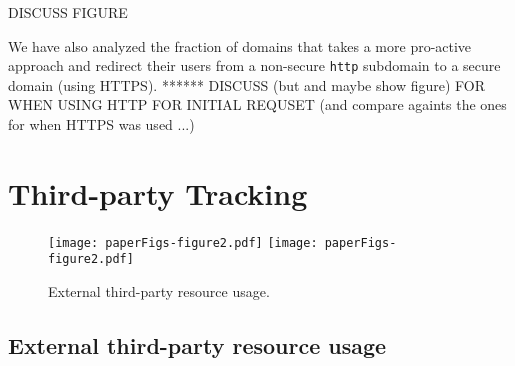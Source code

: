 \documentclass{sig-alternate-10pt}
\begin{document}
DISCUSS FIGURE

We have also analyzed the fraction of domains that takes a 
more pro-active approach and redirect their users from a non-secure \texttt{http} subdomain
to a secure domain (using HTTPS).   
******
DISCUSS (but and maybe show figure) FOR WHEN USING HTTP FOR INITIAL REQUSET
(and compare againts the ones for when HTTPS was used ...)


\section{Third-party Tracking}\label{sec:tracking}


\begin{figure}[t]
\texttt{[image: paperFigs-figure2.pdf]}
\texttt{[image: paperFigs-figure2.pdf]}
\caption{External third-party resource usage.}
\label{fig:external}
\vspace{-0pt}
\end{figure}

\subsection{External third-party resource usage}
\end{document}
